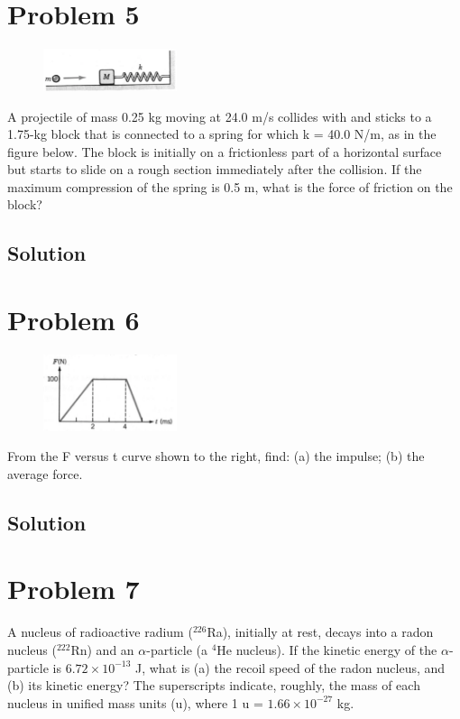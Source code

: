 \documentclass[12pt]{article}
\begin{document}
\pagebreak
\section*{Problem 5}
\begin{figure}
    \vspace{-30pt}
    \includegraphics[width=0.35\textwidth]{graph_5.png} 
\end{figure}
A projectile of mass 0.25 kg moving at 24.0 m/s collides with and sticks to a 1.75-kg block that is connected to a spring for which k = 40.0 N/m, as in the figure below. The block is initially on a frictionless part of a horizontal surface but starts to slide on a rough section immediately after the collision. If the maximum compression of the spring is 0.5 m, what is the force of friction on the block?

\subsection*{Solution}


\pagebreak
\section*{Problem 6}
\begin{figure}
    \vspace{-58pt}
    \includegraphics[width=0.35\textwidth]{graph_6.png} 
\end{figure}
From the F versus t curve shown to the right, find: (a) the impulse; (b) the average force.

\subsection*{Solution}


\pagebreak
\section*{Problem 7}
A nucleus of radioactive radium ($^{226}$Ra), initially at rest, decays into a radon nucleus ($^{222}$Rn) and an $\alpha$-particle (a $^{4}$He nucleus). If the kinetic energy of the $\alpha$-particle is $6.72 \times 10^{-13}$ J, what is (a) the recoil speed of the radon nucleus, and (b) its kinetic energy? The superscripts indicate, roughly, the mass of each nucleus in unified mass units (u), where 1 u = $1.66 \times 10^{-27}$ kg.
\end{document}
